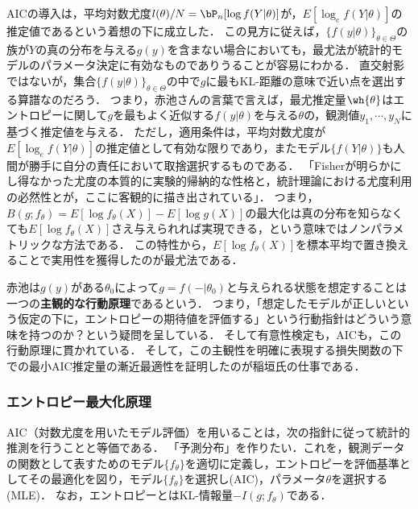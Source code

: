 \documentclass[uplatex,dvipdfmx]{jsreport}
\begin{document}
\begin{discussion}
    AICの導入は，平均対数尤度$l(\theta)/N=\bP_n[\log f(Y|\theta)]$が，$E[\log_ef(Y|\theta)]$の推定値であるという着想の下に成立した．
    この見方に従えば，$\{f(y|\theta)\}_{\theta\in\Theta}$の族が$Y$の真の分布を与える$g(y)$を含まない場合においても，最尤法が統計的モデルのパラメータ決定に有効なものでありうることが容易にわかる．
    直交射影ではないが，集合$\{f(y|\theta)\}_{\theta\in\Theta}$の中で$g$に最もKL-距離の意味で近い点を選出する算譜なのだろう．
    つまり，赤池さんの言葉で言えば，最尤推定量$\wh{\theta}$はエントロピーに関して$g$を最もよく近似する$f(y|\theta)$を与える$\theta$の，観測値$y_1,\cdots,y_N$に基づく推定値を与える．
    ただし，適用条件は，平均対数尤度が$E[\log_ef(Y|\theta)]$の推定値として有効な限りであり，またモデル$\{f(Y|\theta)\}$も人間が勝手に自分の責任において取捨選択するものである．
    「Fisherが明らかにし得なかった尤度の本質的に実験的帰納的な性格と，統計理論における尤度利用の必然性とが，ここに客観的に描き出されている」．
    つまり，$B(g;f_\theta)=E[\log f_\theta(X)]-E[\log g(X)]$の最大化は真の分布を知らなくても$E[\log f_\theta(X)]$さえ与えられれば実現できる，という意味ではノンパラメトリックな方法である．
    この特性から，$E[\log f_\theta(X)]$を標本平均で置き換えることで実用性を獲得したのが最尤法である．
\end{discussion}

\begin{history}[稲垣宣生]
    赤池\cite{赤池76}は$g(y)$がある$\theta_0$によって$g=f(-|\theta_0)$と与えられる状態を想定することは一つの\textbf{主観的な行動原理}であるという．
    つまり，「想定したモデルが正しいという仮定の下に，エントロピーの期待値を評価する」という行動指針はどういう意味を持つのか？という疑問を呈している．
    そして有意性検定も，AICも，この行動原理に貫かれている．
    そして，この主観性を明確に表現する損失関数の下での最小AIC推定量の漸近最適性を証明したのが稲垣氏の仕事である．
\end{history}

\subsubsection{エントロピー最大化原理}

\begin{tcolorbox}[colframe=ForestGreen, colback=ForestGreen!10!white,breakable,colbacktitle=ForestGreen!40!white,coltitle=black,fonttitle=\bfseries\sffamily,
title=]
    AIC（対数尤度を用いたモデル評価）を用いることは，次の指針に従って統計的推測を行うことと等価である\cite{赤池76}．
    「予測分布」を作りたい．これを，観測データの関数として表すためのモデル$\{f_\theta\}$を適切に定義し，エントロピーを評価基準としてその最適化を図り，モデル$\{f_\theta\}$を選択し(AIC)，パラメータ$\theta$を選択する(MLE)．
    なお，エントロピーとはKL-情報量$-I(g;f_\theta)$である．
\end{tcolorbox}
\end{document}
